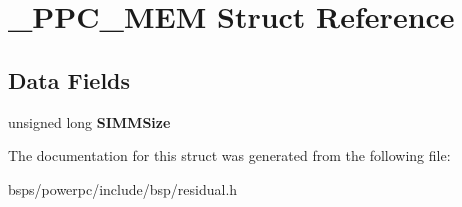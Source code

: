 \hypertarget{struct__PPC__MEM}{}\section{\+\_\+\+P\+P\+C\+\_\+\+M\+EM Struct Reference}
\label{struct__PPC__MEM}
\subsection*{Data Fields}
\begin{DoxyCompactItemize}
\item 
\mbox{\label{struct__PPC__MEM_a77c0abd3098dc3f5aa360525a36b2d43}} 
unsigned long {\bfseries S\+I\+M\+M\+Size}
\end{DoxyCompactItemize}


The documentation for this struct was generated from the following file\+:\begin{DoxyCompactItemize}
\item 
bsps/powerpc/include/bsp/residual.\+h\end{DoxyCompactItemize}
